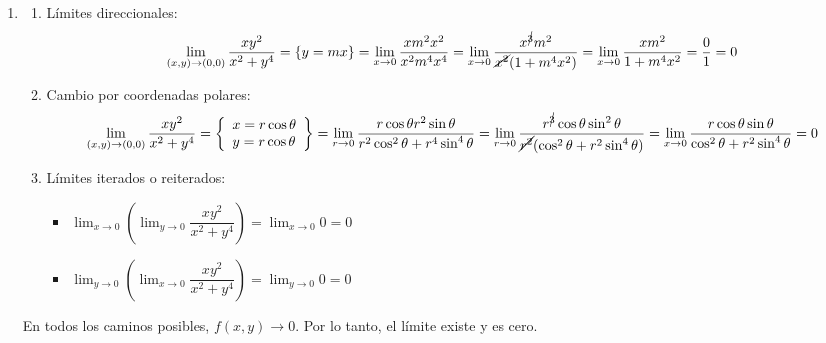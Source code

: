 \begin{enumerate}[label=\color{red}\textbf{\arabic*)}, leftmargin=*]
\item {}
\begin{enumerate}[label=\arabic*)]
\item Límites direccionales:$$
\lim_{ (x,y) \to (0,0) }\dfrac{xy^{2}}{x^{2}+y^4}=\{ y=mx \}=\lim_{ x \to 0 }\dfrac{xm^{2}x^{2}}{x^{2}m^4x^4}=\lim_{ x \to 0 }\dfrac{x^{\cancel{3}}m^{2}}{\cancel{x^{2}}(1+m^4x^{2})}=\lim_{ x \to 0 }\dfrac{xm^{2}}{1+m^4x^{2}}=\dfrac{0}{1}=0
$$
\item Cambio por coordenadas polares: $$
\lim_{ (x,y) \to (0,0) }\dfrac{xy^{2}}{x^{2}+y^4}=\left\{ \begin{array}{l}
x=r\cos\theta \\
y=r\cos\theta
\end{array} \right\}=\lim_{ r \to 0 }\dfrac{r\cos\theta r^{2}\sin\theta}{r^{2}\cos ^{2}\theta+r^4\sin^4\theta}=\lim_{ r \to 0 }\dfrac{r^{\cancel{3}}\cos\theta \sin ^{2}\theta}{\cancel{r^{2}}(\cos ^{2}\theta+r^{2}\sin^4\theta)}=\lim_{ x \to 0 }\dfrac{r\cos\theta \sin\theta}{\cos ^{2}\theta+r^{2}\sin^4\theta}=0
$$
\item Límites iterados o reiterados:
\begin{itemize}[label=\textbullet]
\item $\lim_{ x \to 0 }\left( \lim_{ y \to 0 }\dfrac{xy^{2}}{x^{2}+y^4} \right)=\lim_{ x \to 0 }0=0$
\item $\lim_{ y \to 0 }\left( \lim_{ x \to 0 }\dfrac{xy^{2}}{x^{2}+y^4} \right)=\lim_{ y \to 0 }0=0$
\end{itemize}
\end{enumerate}
En todos los caminos posibles, $f(x,y)\to 0$. Por lo tanto, el límite existe y es cero.


\end{enumerate}
